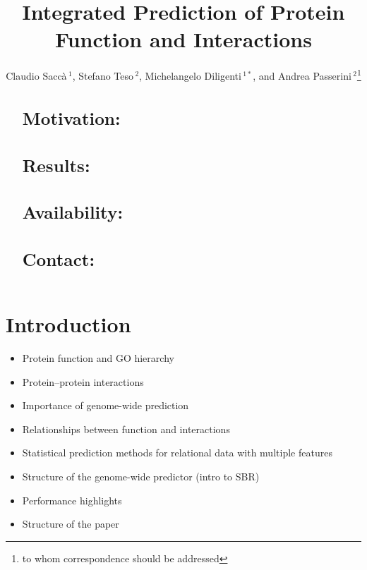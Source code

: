 \documentclass{bioinfo}
\begin{document}

\title[short Title]{Integrated Prediction of Protein Function and Interactions}
\author[Sample \textit{et~al}]{Claudio Sacc\`a\,$^{1}$, Stefano Teso\,$^{2}$, Michelangelo Diligenti\,$^{1*}$, and Andrea Passerini\,$^2$\footnote{to whom correspondence should be addressed}}
\address{
    $^{1}$Dipartimento di Ingegneria dell'Informazione e Scienze Matematiche, University of Siena, Siena, Italy\\
    $^{2}$Dipartimento di Ingegneria e Scienza dell'Informazione, University of Trento, Trento, Italy
}

\maketitle

\begin{abstract}
\section{Motivation:}
\section{Results:}
\section{Availability:}
\section{Contact:}
\end{abstract}



\section{Introduction}

\begin{itemize}

    \item Protein function and GO hierarchy

    \item Protein--protein interactions

    \item Importance of genome-wide prediction

    \item Relationships between function and interactions

    \item Statistical prediction methods for relational data with multiple
    features

    \item Structure of the genome-wide predictor (intro to SBR)

    \item Performance highlights

    \item Structure of the paper

\end{itemize}
\end{document}
